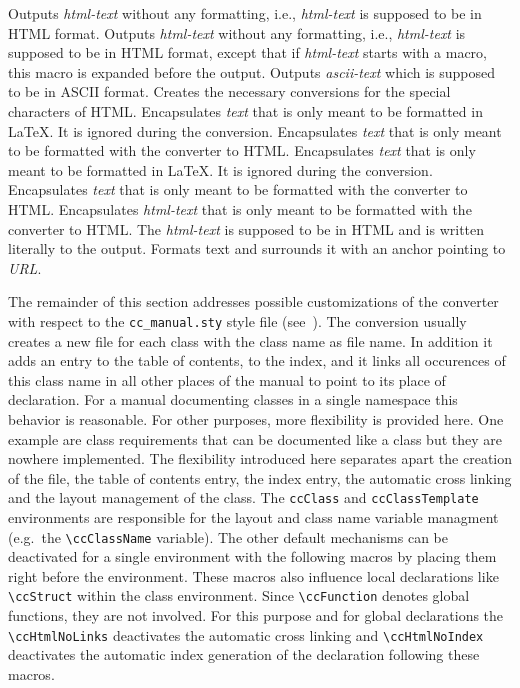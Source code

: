 \documentclass[12pt]{article}
\begin{document}
\begin{description}
    Outputs {\em html-text\/} without any formatting, i.e., {\em html-text\/} 
    is supposed to be in HTML format.
    Outputs {\em html-text\/} without any formatting, i.e., {\em html-text\/} 
    is supposed to be in HTML format, except that if {\em html-text\/} 
    starts with a macro, this macro is expanded before the output.    
    Outputs {\em ascii-text\/} which is supposed to be in ASCII format.
    Creates the necessary conversions for the special characters of HTML.
    Encapsulates {\em text\/} that is only meant to be formatted in \LaTeX.
    It is ignored during the conversion.
    Encapsulates {\em text\/} that is only meant to be formatted with the 
    converter to HTML.
    Encapsulates {\em text\/} that is only meant to be formatted in
    \LaTeX. It is ignored during the conversion.
    Encapsulates {\em text\/} that is only meant to be formatted with the 
    converter to HTML.
    Encapsulates {\em html-text\/} that is only meant to be formatted with the 
    converter to HTML. The {\em html-text\/} is supposed to be in HTML and
    is written literally to the output.
    Formats text and surrounds it with an anchor pointing to {\em URL}.
\end{description}

The remainder of this section addresses possible customizations of the
converter with respect to the {\tt cc\_manual.sty} style file
(see~\cite{k-clswr-99}).  The conversion usually creates a new file
for each class with the class name as file name. In addition it adds
an entry to the table of contents, to the index, and it links all
occurences of this class name in all other places of the manual to
point to its place of declaration. For a manual documenting classes in
a single namespace this behavior is reasonable. For other purposes,
more flexibility is provided here. One example are class requirements
that can be documented like a class but they are nowhere implemented.
The flexibility introduced here separates apart the creation of the
file, the table of contents entry, the index entry, the automatic
cross linking and the layout management of the class. The
\verb+ccClass+ and \verb+ccClassTemplate+ environments are responsible
for the layout and class name variable managment (e.g.~the
\verb+\ccClassName+ variable).  The other default mechanisms can be
deactivated for a single environment with the following macros by
placing them right before the environment. These macros also influence
local declarations like \verb+\ccStruct+ within the class environment.
Since \verb+\ccFunction+ denotes global functions, they are not
involved.  For this purpose and for global declarations the
\verb+\ccHtmlNoLinks+ deactivates the automatic cross linking and
\verb+\ccHtmlNoIndex+ deactivates the automatic index generation of
the declaration following these macros.
\end{document}
